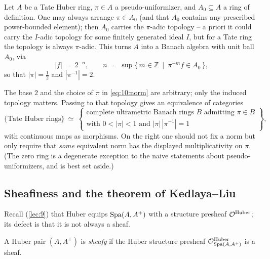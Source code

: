 \begin{proposition}
\label{prop:10:banach-structure}
Let $A$ be a Tate Huber ring, $\pi\in A$ a pseudo-uniformizer, and
$A_{0}\subseteq A$ a ring of definition. One may always arrange $\pi\in A_{0}$
(and that $A_{0}$ contains any prescribed power-bounded element); then $A_{0}$
carries the $\pi$-adic topology -- a priori it could carry the $I$-adic topology
for some finitely generated ideal $I$, but for a Tate ring the topology is always
$\pi$-adic. This turns $A$ into a Banach algebra with unit ball $A_{0}$, via
\begin{equation}
\label{eq:10:norm}
|f|\ =\ 2^{-n},\qquad n\ =\ \sup\{\,m\in\mathbb{Z}\ \mid\ \pi^{-m}f\in A_{0}\,\},
\end{equation}
so that $|\pi|=\tfrac12$ and $|\pi^{-1}|=2$.
\end{proposition}

\begin{remark}
\label{rmk:10:banach-equivalence}
The base $2$ and the choice of $\pi$ in \eqref{eq:10:norm} are arbitrary; only the
induced topology matters. Passing to that topology gives an equivalence of
categories
\begin{equation*}
\{\text{Tate Huber rings}\}\ \simeq\
\left\{\begin{array}{c}
\text{complete ultrametric Banach rings } B \text{ admitting } \pi\in B\\
\text{with } 0<|\pi|<1 \text{ and } |\pi|\,|\pi^{-1}|=1
\end{array}\right\},
\end{equation*}
with continuous maps as morphisms. On the right one should not fix a norm but only
require that \emph{some} equivalent norm has the displayed multiplicativity on
$\pi$. (The zero ring is a degenerate exception to the naive statements about
pseudo-uniformizers, and is best set aside.)
\end{remark}

\subsection{Sheafiness and the theorem of Kedlaya--Liu}

Recall (\cref{lec:9}) that Huber equips $\operatorname{Spa}(A,A^{+})$ with a structure
presheaf $\mathcal{O}^{\mathrm{Huber}}$; its defect is that it is not always a sheaf.

\begin{definition}[Sheafy]
\label{def:10:sheafy}
A Huber pair $(A,A^{+})$ is \emph{sheafy} if the Huber structure presheaf
$\mathcal{O}^{\mathrm{Huber}}_{\operatorname{Spa}(A,A^{+})}$ is a sheaf.
\end{definition}

